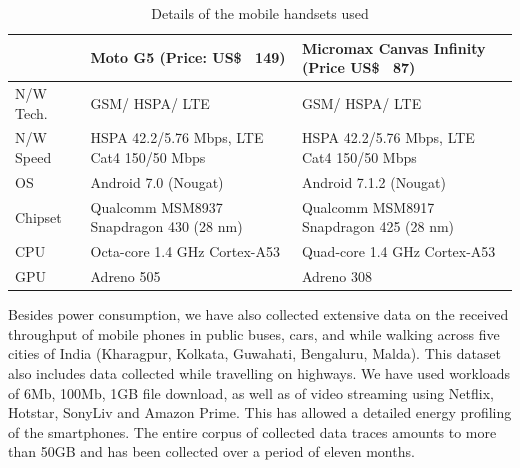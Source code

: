 
\begin{table}[!t]
    \scriptsize
    \centering
      \caption{Details of the mobile handsets used}
    \begin{tabular}{|p{1cm}||p{6.5cm}|p{6.5cm}|}
    \hline
         \textbf{}  & \textbf{Moto G5 (Price: US\$ ~149)} & \textbf{Micromax Canvas Infinity (Price US\$ ~87)}\\
          \hline \hline 
         N/W Tech. & GSM/ HSPA/ LTE &  GSM/ HSPA/ LTE\\ \hline
         N/W Speed & HSPA 42.2/5.76 Mbps, LTE Cat4 150/50 Mbps & HSPA 42.2/5.76 Mbps, LTE Cat4 150/50 Mbps\\ \hline
         OS & Android 7.0 (Nougat) & Android 7.1.2 (Nougat) \\ \hline
         Chipset & Qualcomm MSM8937 Snapdragon 430 (28 nm) & Qualcomm MSM8917 Snapdragon 425 (28 nm)\\ \hline
         CPU & Octa-core 1.4 GHz Cortex-A53 & Quad-core 1.4 GHz Cortex-A53\\ \hline
         GPU & Adreno 505 & Adreno 308\\ \hline
    \end{tabular}
    \label{tab:handset_details}
\end{table}

\indent Besides power consumption, we have also collected extensive data on the received throughput of mobile phones in public buses, cars, and while walking across five cities of India (Kharagpur, Kolkata, Guwahati, Bengaluru, Malda). This dataset also includes data collected while travelling on highways. We have used workloads of 6Mb, 100Mb, 1GB file download, as well as of video streaming using Netflix, Hotstar, SonyLiv and Amazon Prime. This has allowed a detailed energy profiling of the smartphones. The entire corpus of collected data traces amounts to more than 50GB and has been collected over a period of eleven months. 

